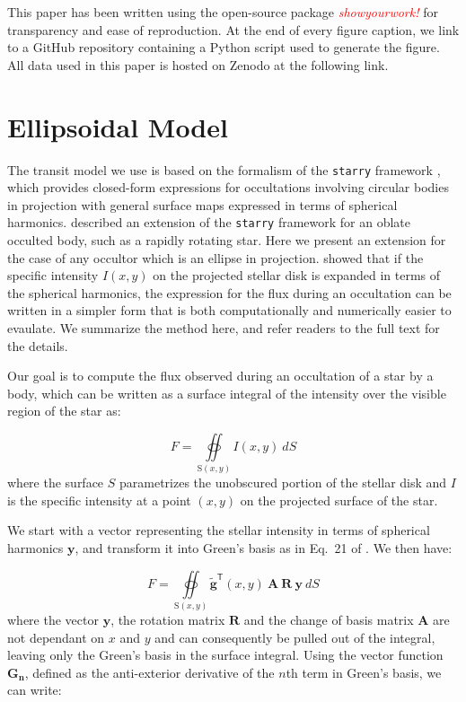 \documentclass[twocolumn]{aastex631}
\begin{document}
This paper has been written using the open-source package \textcolor{red}{\textit{showyourwork!}} for transparency and ease of reproduction. At the end of every figure caption, we link to a GitHub repository containing a Python script used to generate the figure. All data used in this paper is hosted on Zenodo at the following link.

\section{Ellipsoidal Model}
\label{sec:model}
The transit model we use is based on the formalism of the \texttt{starry} framework \citep{starry2019}, which provides closed-form expressions for occultations involving circular bodies in projection with general surface maps expressed in terms of spherical harmonics. \citet{dholakia2022} described an extension of the \texttt{starry} framework for an oblate occulted body, such as a rapidly rotating star. Here we present an extension for the case of any occultor which is an ellipse in projection. \citet{starry2019} showed that if the specific intensity $I(x,y)$ on the projected stellar disk is expanded in terms of the spherical harmonics, the expression for the flux during an occultation can be written in a simpler form that is both computationally and numerically easier to evaulate. We summarize the method here, and refer readers to the full text for the details. 

Our goal is to compute the flux observed during an occultation of a star by a body, which can be written as a surface integral of the intensity over the visible region of the star as:

\begin{equation}
   F = \oiint\limits_{\mathrm{S}(x,y)} I(x,y) \ dS
\end{equation}
where the surface $S$ parametrizes the unobscured portion of the stellar disk and $I$ is the specific intensity at a point $(x,y)$ on the projected surface of the star.

We start with a vector representing the stellar intensity in terms of spherical harmonics $\mathbf{y}$, and transform it into Green's basis as in Eq.~21 of \citet{starry2019}. We then have: 

\begin{equation}
   F = \oiint\limits_{\mathrm{S}(x,y)} \mathbf{\tilde{g}}^\mathsf{T}(x,y) \ \mathbf{A}\ \mathbf{R}\ \mathbf{y}\ dS 
\end{equation}
where the vector $\mathbf{y}$, the rotation matrix $\mathbf{R}$ and the change of basis matrix $\mathbf{A}$ are not dependant on $x$ and $y$ and can consequently be pulled out of the integral, leaving only the Green's basis in the surface integral. Using the vector function $\mathbf{G_n}$, defined as the anti-exterior derivative of the $n$th term in Green's basis, we can write:
\end{document}

